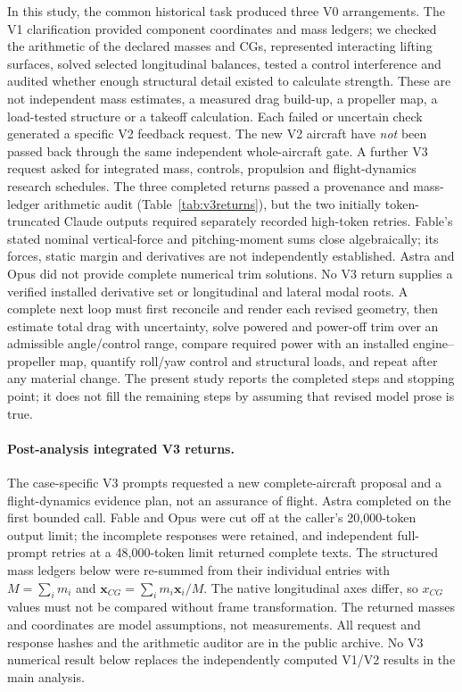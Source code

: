 \documentclass[11pt,a4paper]{article}
\begin{document}
In this study, the common historical task produced three V0 arrangements. The V1 clarification provided component coordinates and mass ledgers; we checked the arithmetic of the declared masses and CGs, represented interacting lifting surfaces, solved selected longitudinal balances, tested a control interference and audited whether enough structural detail existed to calculate strength. These are not independent mass estimates, a measured drag build-up, a propeller map, a load-tested structure or a takeoff calculation. Each failed or uncertain check generated a specific V2 feedback request. The new V2 aircraft have \emph{not} been passed back through the same independent whole-aircraft gate. A further V3 request asked for integrated mass, controls, propulsion and flight-dynamics research schedules. The three completed returns passed a provenance and mass-ledger arithmetic audit (Table~\ref{tab:v3returns}), but the two initially token-truncated Claude outputs required separately recorded high-token retries. Fable's stated nominal vertical-force and pitching-moment sums close algebraically; its forces, static margin and derivatives are not independently established. Astra and Opus did not provide complete numerical trim solutions. No V3 return supplies a verified installed derivative set or longitudinal and lateral modal roots. A complete next loop must first reconcile and render each revised geometry, then estimate total drag with uncertainty, solve powered and power-off trim over an admissible angle/control range, compare required power with an installed engine--propeller map, quantify roll/yaw control and structural loads, and repeat after any material change. The present study reports the completed steps and stopping point; it does not fill the remaining steps by assuming that revised model prose is true.

\paragraph{Post-analysis integrated V3 returns.}
The case-specific V3 prompts requested a new complete-aircraft proposal and a
flight-dynamics evidence plan, not an assurance of flight. Astra completed on
the first bounded call. Fable and Opus were cut off at the caller's 20,000-token
output limit; the incomplete responses were retained, and independent
full-prompt retries at a 48,000-token limit returned complete texts. The
structured mass ledgers below were re-summed from their individual entries
with $M=\sum_i m_i$ and $\mathbf{x}_{CG}=\sum_i m_i\mathbf{x}_i/M$.
The native longitudinal axes differ, so $x_{CG}$ values must not be compared
without frame transformation. The returned masses and coordinates are
model assumptions, not measurements. All request and response hashes and the
arithmetic auditor are in the public archive. No V3 numerical result below
replaces the independently computed V1/V2 results in the main analysis.
\end{document}

